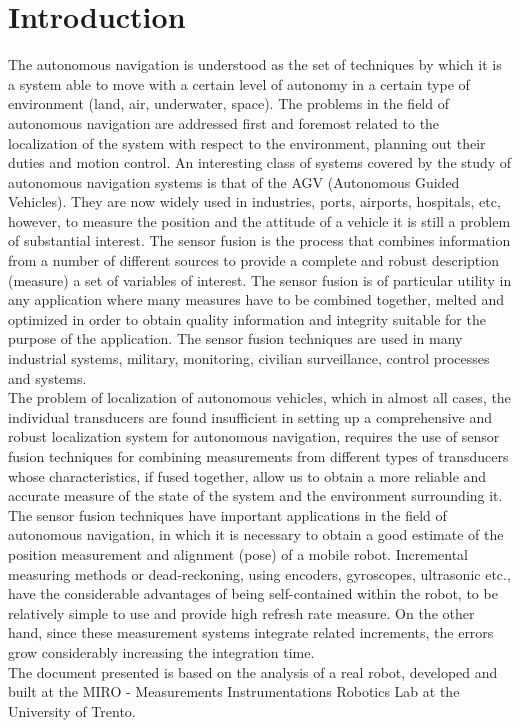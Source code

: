 \section{Introduction}
The autonomous navigation is understood as the set of techniques by which it is a system able to move with a certain level of autonomy in a certain type of environment (land, air, underwater, space). The problems in the field of autonomous navigation are addressed first and foremost related to the localization of the system with respect to the environment, planning out their duties and motion control.
An interesting class of systems covered by the study of autonomous navigation systems is that of the AGV (Autonomous Guided Vehicles). They are now widely used in industries, ports, airports, hospitals, etc, however, to measure the position and the attitude of a vehicle it is still a problem of substantial interest.
The sensor fusion is the process that combines information from a number of different sources to provide a complete and robust description (measure) a set of variables of interest. The sensor fusion is of particular utility in any application where many measures have to be combined together, melted and optimized in order to obtain quality information and integrity suitable for the purpose of the application. The sensor fusion techniques are used in many industrial systems, military, monitoring, civilian surveillance, control processes and systems.\\ The problem of localization of autonomous vehicles, which in almost all cases, the individual transducers are found insufficient in setting up a comprehensive and robust localization system for autonomous navigation, requires the use of sensor fusion techniques for combining measurements from different types of transducers whose characteristics, if fused together, allow us to obtain a more reliable and accurate measure of the state of the system and the environment surrounding it.
The sensor fusion techniques have important applications in the field of autonomous navigation, in which it is necessary to obtain a good estimate of the position measurement and alignment (pose) of a mobile robot. Incremental measuring methods or dead-reckoning, using encoders, gyroscopes, ultrasonic etc., have the considerable advantages of being self-contained within the robot, to be relatively simple to use and provide high refresh rate measure. On the other hand, since these measurement systems integrate related increments, the errors grow considerably increasing the integration time.
\\The document presented is based on the analysis of a real robot, developed and built at the MIRO - Measurements Instrumentations Robotics Lab at the University of Trento.
